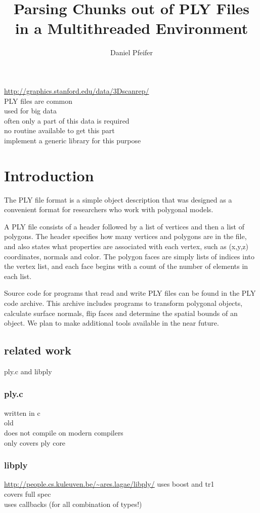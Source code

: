 \documentclass[a4paper,parskip=half]{scrartcl}
\title{Parsing Chunks out of PLY Files\\in a Multithreaded Environment}
\author{Daniel Pfeifer}
\begin{document}
%
\maketitle
%
\abstract
%
\url{http://graphics.stanford.edu/data/3Dscanrep/}\\
PLY files are common\\
used for big data\\
often only a part of this data is required\\
no routine available to get this part\\
implement a generic library for this purpose\\
%

\section{Introduction}
The PLY file format is a simple object description that was designed as a
convenient format for researchers who work with polygonal models.

A PLY file consists of a header followed by a list of vertices and then a list of
polygons. The header specifies how many vertices and polygons are in the file,
and also states what properties are associated with each vertex, such as (x,y,z)
coordinates, normals and color. The polygon faces are simply lists of indices
into the vertex list, and each face begins with a count of the number of elements
in each list.

Source code for programs that read and write PLY files can be found in the PLY
code archive. This archive includes programs to transform polygonal objects,
calculate surface normals, flip faces and determine the spatial bounds of an
object. We plan to make additional tools available in the near future.

\subsection{related work}
%
ply.c and libply

\subsubsection{ply.c}
written in c\\
old\\
does not compile on modern compilers\\
only covers ply core\\

\subsubsection{libply}
\url{http://people.cs.kuleuven.be/~ares.lagae/libply/}
uses boost and tr1\\
covers full spec\\
uses callbacks (for all combination of types!)\\
\end{document}
